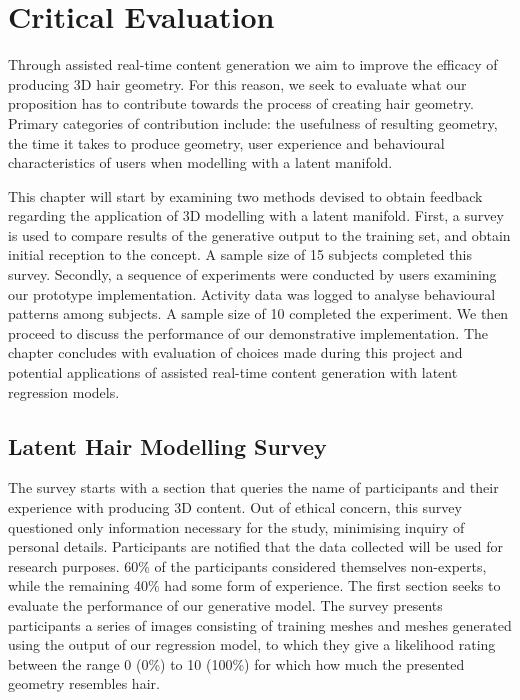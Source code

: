 \documentclass[ %
author={Dillon Keith Diep},
supervisor={Dr. Carl Henrik Ek},
degree={MEng},
title={ART-CG Hair:},
subtitle={Assisted Real-time Content Generation of Stylised Virtual Hair},
type={Research},
year={2017} ]{dissertation}
\begin{document}

\chapter{Critical Evaluation}
\label{chap:evaluation}

Through assisted real-time content generation we aim to improve the efficacy of producing 3D hair geometry. For this reason, we seek to evaluate what our proposition has to contribute towards the process of creating hair geometry. Primary categories of contribution include: the usefulness of resulting geometry, the time it takes to produce geometry, user experience and behavioural characteristics of users when modelling with a latent manifold.

This chapter will start by examining two methods devised to obtain feedback regarding the application of 3D modelling with a latent manifold. First, a survey is used to compare results of the generative output to the training set, and obtain initial reception to the concept. A sample size of 15 subjects completed this survey. Secondly, a sequence of experiments were conducted by users examining our prototype implementation. Activity data was logged to analyse behavioural patterns among subjects. A sample size of 10 completed the experiment. We then proceed to discuss the performance of our demonstrative implementation. The chapter concludes with evaluation of choices made during this project and potential applications of assisted real-time content generation with latent regression models.

\section{Latent Hair Modelling Survey}
The survey starts with a section that queries the name of participants and their experience with producing 3D content. Out of ethical concern, this survey questioned only information necessary for the study, minimising inquiry of personal details. Participants are notified that the data collected will be used for research purposes. 60\% of the participants considered themselves non-experts, while the remaining 40\% had some form of experience. The first section seeks to evaluate the performance of our generative model. The survey presents participants a series of images consisting of training meshes and meshes generated using the output of our regression model, to which they give a likelihood rating between the range 0 (0\%) to 10 (100\%) for which how much the presented geometry resembles hair. 
\end{document}
